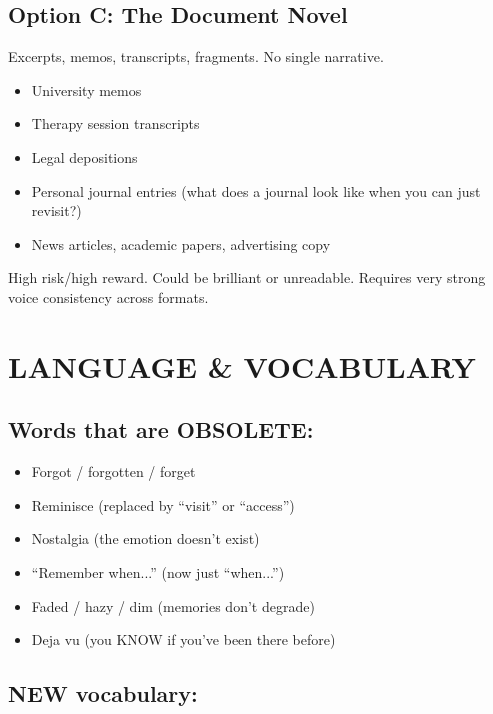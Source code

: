 \documentclass[11pt,letterpaper]{article}
\begin{document}
\subsection*{Option C: The Document Novel}

Excerpts, memos, transcripts, fragments. No single narrative.

\begin{itemize}
    \item University memos
    \item Therapy session transcripts
    \item Legal depositions
    \item Personal journal entries (what does a journal look like when you can just revisit?)
    \item News articles, academic papers, advertising copy
\end{itemize}

\textcolor{warnorange}{High risk/high reward. Could be brilliant or unreadable. Requires very strong voice consistency across formats.}

\vspace{1em}

\section*{LANGUAGE \& VOCABULARY}

\subsection*{Words that are OBSOLETE:}

\begin{itemize}
    \item Forgot / forgotten / forget
    \item Reminisce (replaced by ``visit'' or ``access'')
    \item Nostalgia (the emotion doesn't exist)
    \item ``Remember when...'' (now just ``when...'')
    \item Faded / hazy / dim (memories don't degrade)
    \item Deja vu (you KNOW if you've been there before)
\end{itemize}

\subsection*{NEW vocabulary:}
\end{document}

